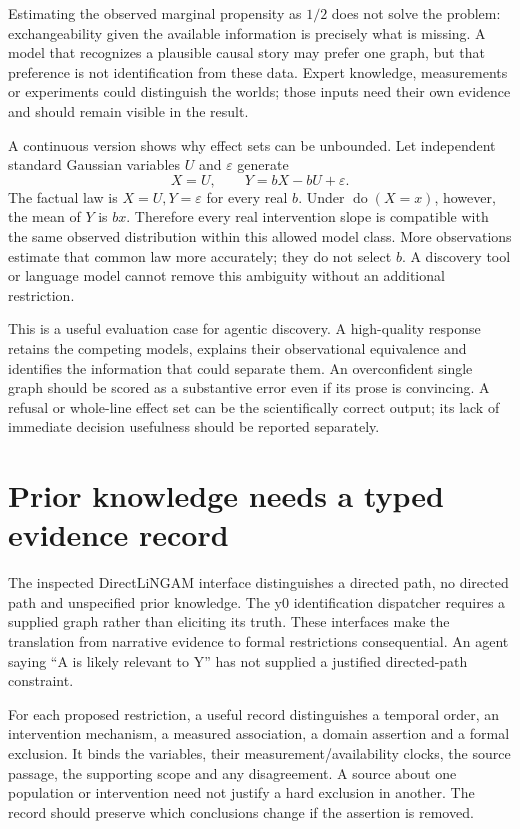 Estimating the observed marginal propensity as $1/2$ does not solve the
problem: exchangeability given the available information is precisely what is
missing. A model that recognizes a plausible causal story may prefer one graph,
but that preference is not identification from these data. Expert knowledge,
measurements or experiments could distinguish the worlds; those inputs need
their own evidence and should remain visible in the result.

A continuous version shows why effect sets can be unbounded. Let independent
standard Gaussian variables $U$ and $\varepsilon$ generate
\[
 X=U,\qquad Y=bX-bU+\varepsilon.
\]
The factual law is $X=U,Y=\varepsilon$ for every real $b$. Under
$\operatorname{do}(X=x)$, however, the mean of $Y$ is $bx$. Therefore every
real intervention slope is compatible with the same observed distribution
within this allowed model class. More observations estimate that common law
more accurately; they do not select $b$. A discovery tool or language model
cannot remove this ambiguity without an additional restriction.

This is a useful evaluation case for agentic discovery. A high-quality response
retains the competing models, explains their observational equivalence and
identifies the information that could separate them. An overconfident single
graph should be scored as a substantive error even if its prose is convincing.
A refusal or whole-line effect set can be the scientifically correct output;
its lack of immediate decision usefulness should be reported separately.

\section{Prior knowledge needs a typed evidence record}

The inspected DirectLiNGAM interface distinguishes a directed path, no directed
path and unspecified prior knowledge. The y0 identification dispatcher requires
a supplied graph rather than eliciting its truth. These interfaces make the
translation from narrative evidence to formal restrictions consequential.
An agent saying ``A is likely relevant to Y'' has not supplied a justified
directed-path constraint. \cite{v13_sw_lingam,v13_sw_y0}

For each proposed restriction, a useful record distinguishes a temporal order,
an intervention mechanism, a measured association, a domain assertion and a
formal exclusion. It binds the variables, their measurement/availability clocks,
the source passage, the supporting scope and any disagreement. A source about
one population or intervention need not justify a hard exclusion in another.
The record should preserve which conclusions change if the assertion is removed.

